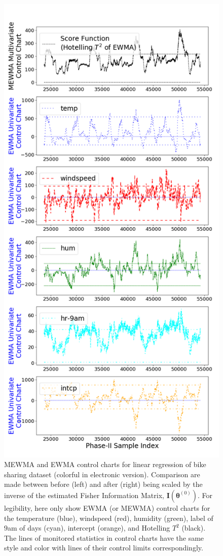 \documentclass[twoside,11pt]{article}
\begin{document}
\begin{figure}[!htbp]
\includegraphics[width = 0.48\linewidth]{../figures/v14/bike_sharing/reg_scal_train/PII_pos_single_bike_fisher_mlines_with_regu_1e-08_0_0001_0_005_99_0.png}
  \caption{
  MEWMA and EWMA control charts for linear regression of bike sharing dataset (colorful in electronic version). Comparison are made between before (left) and after (right) being scaled by the inverse of the estimated Fisher Information Matrix, $\mathbf {I} ( {\bm{\theta}} ^{(0)})$. For legibility, here only show EWMA (or MEWMA) control charts for the temperature (blue), windspeed (red), humidity (green), label of $9$am of days (cyan), intercept (orange), and Hotelling $T^2$ (black). The lines of monitored statistics in control charts have the same style and color with lines of their control limits correspondingly.
}
\label{fig:bike_sharing_diag}
\end{figure}
\end{document}
